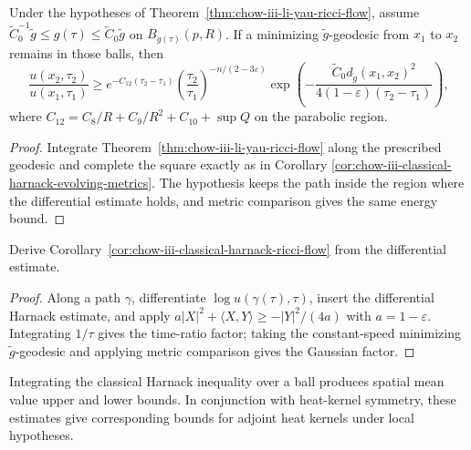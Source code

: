 \begin{corollary}
\label{cor:chow-iii-classical-harnack-ricci-flow}
Under the hypotheses of Theorem~\ref{thm:chow-iii-li-yau-ricci-flow}, assume
\(\widetilde C_0^{-1}\widetilde g\leq g(\tau)\leq
\widetilde C_0\widetilde g\) on \(B_{g(\tau)}(p,R)\).  If a minimizing
\(\widetilde g\)-geodesic from \(x_1\) to \(x_2\) remains in those balls,
then
\[
 \frac{u(x_2,\tau_2)}{u(x_1,\tau_1)}
 \geq e^{-C_{12}(\tau_2-\tau_1)}
 \left(\frac{\tau_2}{\tau_1}\right)^{-n/(2-3\varepsilon)}
 \exp\left(-\frac{\widetilde C_0d_{\widetilde g}(x_1,x_2)^2}
 {4(1-\varepsilon)(\tau_2-\tau_1)}\right),
\]
where
\(C_{12}=C_8/R+C_9/R^2+C_{10}+\sup Q\) on the parabolic region.
\end{corollary}
\begin{proof}
Integrate Theorem~\ref{thm:chow-iii-li-yau-ricci-flow} along the prescribed
geodesic and complete the square exactly as in Corollary
\ref{cor:chow-iii-classical-harnack-evolving-metrics}.  The hypothesis keeps
the path inside the region where the differential estimate holds, and metric
comparison gives the same energy bound.
\end{proof}

\begin{example}
\label{ex:chow-iii-integrate-ricci-flow-gradient-estimate}
Derive Corollary~\ref{cor:chow-iii-classical-harnack-ricci-flow} from the
differential estimate.
\end{example}
\begin{proof}
Along a path \(\gamma\), differentiate \(\log u(\gamma(\tau),\tau)\), insert
the differential Harnack estimate, and apply
\(a|X|^2+\langle X,Y\rangle\geq-|Y|^2/(4a)\) with
\(a=1-\varepsilon\).  Integrating \(1/\tau\) gives the time-ratio factor;
taking the constant-speed minimizing \(\widetilde g\)-geodesic and applying
metric comparison gives the Gaussian factor.
\end{proof}

\begin{remark}
\label{rem:chow-iii-harnack-mean-value-adjoint-kernels}
Integrating the classical Harnack inequality over a ball produces spatial
mean value upper and lower bounds.  In conjunction with heat-kernel symmetry,
these estimates give corresponding bounds for adjoint heat kernels under
local hypotheses.
\end{remark}

